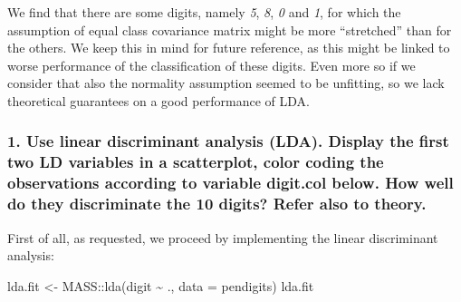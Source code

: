 \documentclass[
  letterpaper,
  DIV=11,
  numbers=noendperiod]{scrartcl}
\newenvironment{Shaded}{\begin{snugshade}}{\end{snugshade}}
\newcommand{\AttributeTok}[1]{\textcolor[rgb]{0.40,0.45,0.13}{#1}}
\newcommand{\FunctionTok}[1]{\textcolor[rgb]{0.28,0.35,0.67}{#1}}
\newcommand{\NormalTok}[1]{\textcolor[rgb]{0.00,0.23,0.31}{#1}}
\newcommand{\OtherTok}[1]{\textcolor[rgb]{0.00,0.23,0.31}{#1}}
\newcommand{\SpecialCharTok}[1]{\textcolor[rgb]{0.37,0.37,0.37}{#1}}
\begin{document}
We find that there are some digits, namely \emph{5}, \emph{8}, \emph{0}
and \emph{1}, for which the assumption of equal class covariance matrix
might be more ``stretched'' than for the others. We keep this in mind
for future reference, as this might be linked to worse performance of
the classification of these digits. Even more so if we consider that
also the normality assumption seemed to be unfitting, so we lack
theoretical guarantees on a good performance of LDA.

\hypertarget{use-linear-discriminant-analysis-lda.-display-the-first-two-ld-variables-in-a-scatterplot-color-coding-the-observations-according-to-variable-digit.col-below.-how-well-do-they-discriminate-the-10-digits-refer-also-to-theory.}{%
\subsubsection{1. Use linear discriminant analysis (LDA). Display the
first two LD variables in a scatterplot, color coding the observations
according to variable digit.col below. How well do they discriminate the
10 digits? Refer also to
theory.}\label{use-linear-discriminant-analysis-lda.-display-the-first-two-ld-variables-in-a-scatterplot-color-coding-the-observations-according-to-variable-digit.col-below.-how-well-do-they-discriminate-the-10-digits-refer-also-to-theory.}}

First of all, as requested, we proceed by implementing the linear
discriminant analysis:

\begin{Shaded}
\begin{Highlighting}[]
\NormalTok{lda.fit }\OtherTok{\textless{}{-}}\NormalTok{ MASS}\SpecialCharTok{::}\FunctionTok{lda}\NormalTok{(digit }\SpecialCharTok{\textasciitilde{}}\NormalTok{ ., }\AttributeTok{data =}\NormalTok{ pendigits)}
\NormalTok{lda.fit}
\end{Highlighting}
\end{Shaded}
\end{document}
